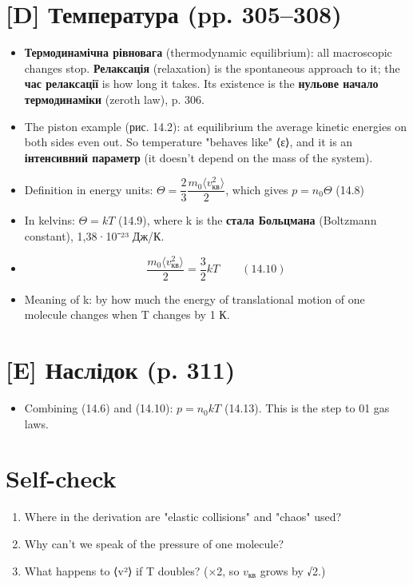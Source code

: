 \documentclass[11pt,a4paper,oneside]{book}
\begin{document}
\section*{[D] Температура (pp. 305–308)}
\begin{itemize}
\item \textbf{Термодинамічна рівновага} (thermodynamic equilibrium): all macroscopic changes stop. \textbf{Релаксація} (relaxation) is the spontaneous approach to it; the \textbf{час релаксації} is how long it takes. Its existence is the \textbf{нульове начало термодинаміки} (zeroth law), p. 306.
\item The piston example (рис. 14.2): at equilibrium the average kinetic energies on both sides even out. So temperature "behaves like" ⟨ε⟩, and it is an \textbf{інтенсивний параметр} (it doesn't depend on the mass of the system).
\item Definition in energy units: $\Theta = \dfrac23\dfrac{m_0\langle v_{\text{кв}}^2\rangle}{2}$, which gives $p = n_0\Theta$ (14.8)
\item In kelvins: $\Theta = kT$ (14.9), where k is the \textbf{стала Больцмана} (Boltzmann constant), 1,38·10⁻²³ Дж/К.
\item \[\frac{m_0\langle v_{\text{кв}}^2\rangle}{2} = \frac32kT\qquad(14.10)\]
\item Meaning of k: by how much the energy of translational motion of one molecule changes when T changes by 1 К.
\end{itemize}

\section*{[E] Наслідок (p. 311)}
\begin{itemize}
\item Combining (14.6) and (14.10): $p = n_0kT$ (14.13). This is the step to 01 gas laws.
\end{itemize}

\section*{Self-check}
\begin{enumerate}
\item Where in the derivation are "elastic collisions" and "chaos" used?
\item Why can't we speak of the pressure of one molecule?
\item What happens to ⟨v²⟩ if T doubles? (×2, so $v_{\text{кв}}$ grows by √2.)
\end{enumerate}
\end{document}
